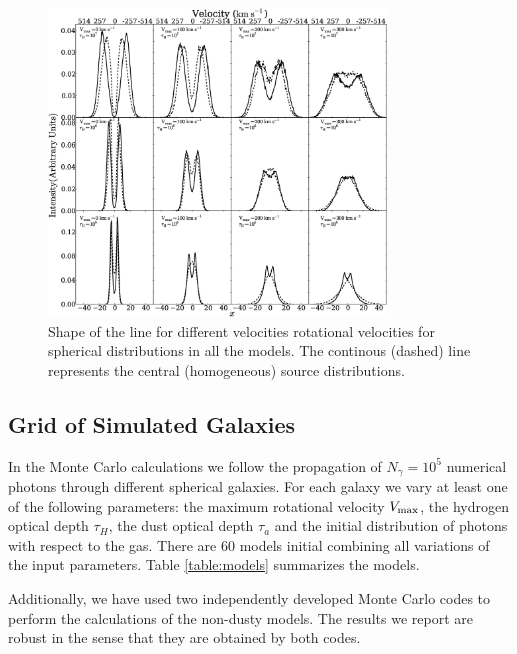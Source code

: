 \documentclass{emulateapj}
\newcommand{\ly}{{\ifmmode{{\rm Ly}\alpha~}\else{Ly$\alpha$~}\fi}}
\begin{document}
\begin{figure}
\begin{center}
  \includegraphics[width=0.8\textwidth]{f1.eps}
\end{center}
\caption{Shape of the \ly line for
    different velocities rotational velocities for spherical
    distributions in all the models. The continous (dashed) line represents the 
    central (homogeneous) source distributions.
    \label{fig:differentvelocities}}  
\end{figure}


\subsection{Grid of Simulated Galaxies}
\label{sec:models}

In the Monte Carlo calculations we follow the propagation of $N_{\gamma}=10^5$
numerical photons through different spherical galaxies. For each galaxy
we vary at least one of the following parameters: the maximum
rotational velocity $V_{\rm max}$, the hydrogen optical depth $\tau_{H}$,
the dust optical depth $\tau_{a}$ and the initial distribution of photons
with respect to the gas. There are $60$ models initial combining all
variations of the input parameters. Table \ref{table:models}
summarizes the models.

Additionally, we have used two independently developed Monte Carlo
codes \citep{CLARA,DijkstraKramer} to perform the calculations of the
non-dusty models. The results we report are robust in the sense
that they are obtained by both codes. 
\end{document}
